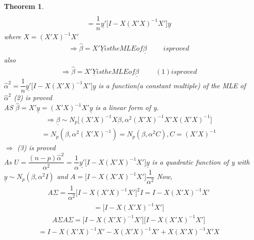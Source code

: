 \documentclass[12pt]{article}
\newtheorem{theorem}{\bf{Theorem}}[section]
\numberwithin{equation}{section}
\begin{document}
\begin{theorem}
\begin{eqnarray*}
\end{eqnarray*}
\begin{eqnarray*}
= \dfrac{1}{n}\underline{y'} \big[I-X(X'X)^{-1}X'\big]\underline{y}
\end{eqnarray*}
where $X = (X'X)^{-1}X'$
\begin{eqnarray*}
\Longrightarrow \hat{\beta} = X'\underline{Y} is the MLE of \underline{\beta} \hspace{1cm}is proved
\end{eqnarray*}
also
\begin{eqnarray*}
\Longrightarrow \hat{\beta} = X'\underline{Y} is the MLE of \underline{\beta} \hspace{1cm}(1) is proved
\end{eqnarray*}
$\hat{\alpha}^{2}= \dfrac{1}{n}\underline{y'} \big[I-X(X'X)^{-1}X'\big]\underline{y} $
is a function(a constant multiple) of the MLE of
$\hat{\alpha}^{2}$ (2) is proved\\
AS $\hat{\beta} = X'\underline{y} = (X'X)^{-1}X'\underline{y}$ is a linear form of y.
\begin{eqnarray*}
\Longrightarrow \underline{\beta} \sim N_{p}\big[(X'X)^{-1}X\beta, \alpha^{2}(X'X)^{-1}X'X(X'X)^{-1}\big]
\end{eqnarray*}
\begin{eqnarray*}
= N_{p}(\beta, \alpha^{2}(X'X)^{-1}) = N_{p}(\beta, \alpha^{2}C), C = (X'X)^{-1}
\end{eqnarray*}
$\Longrightarrow$ (3) is proved\\
As $U = \dfrac{(n-p)\hat{\alpha}^{2}}{\alpha^{2}} = \dfrac{1}{\alpha}\underline{y'}\big[I-X(X'X)^{-1}X'\big]\underline{y}$ is a quadratic function of \underline{y} with \\$\underline{y} \sim N_{p}(\beta, \alpha^{2}I)$ and $A = \big[I - X(X'X)^{-1}X'\big]\dfrac{1}{\alpha^{2}}$
Now,
\begin{eqnarray*}
A\Sigma = \dfrac{1}{\alpha^{2}}\big[I-X(X'X)^{-1}X'\big]^{2}I = I - X(X'X)^{-1}X'
\end{eqnarray*}
\begin{eqnarray*}
 = \big[I-X(X'X)^{-1}X'\big]
\end{eqnarray*}
\begin{eqnarray*}
A\Sigma A\Sigma  = \big[I-X(X'X)^{-1}X'\big]\big[I-X(X'X)^{-1}X'\big]
\end{eqnarray*}
\begin{eqnarray*}
= I-X(X'X)^{-1}X'-X(X'X)^{-1}X' + X(X'X)^{-1}X'X
\end{eqnarray*}
\begin{eqnarray*}

\end{eqnarray*}
\end{theorem}
\end{document}
